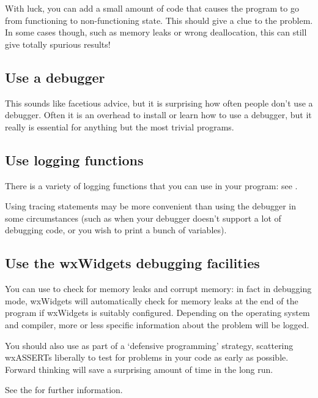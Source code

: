 With luck, you can add a small amount of code that causes the program
to go from functioning to non-functioning state. This should give a clue
to the problem. In some cases though, such as memory leaks or wrong
deallocation, this can still give totally spurious results!

\subsection{Use a debugger}\label{usedebugger}

This sounds like facetious advice, but it is surprising how often people
don't use a debugger. Often it is an overhead to install or learn how to
use a debugger, but it really is essential for anything but the most
trivial programs.

\subsection{Use logging functions}\label{uselogging}

There is a variety of logging functions that you can use in your program:
see .

Using tracing statements may be more convenient than using the debugger
in some circumstances (such as when your debugger doesn't support a lot
of debugging code, or you wish to print a bunch of variables).

\subsection{Use the wxWidgets debugging facilities}\label{usedebuggingfacilities}

You can use  to check for
memory leaks and corrupt memory: in fact in debugging mode, wxWidgets will
automatically check for memory leaks at the end of the program if wxWidgets is suitably
configured. Depending on the operating system and compiler, more or less
specific information about the problem will be logged.

You should also use  as part of a `defensive programming' strategy,
scattering wxASSERTs liberally to test for problems in your code as early as possible. Forward thinking
will save a surprising amount of time in the long run.

See the  for further information.

